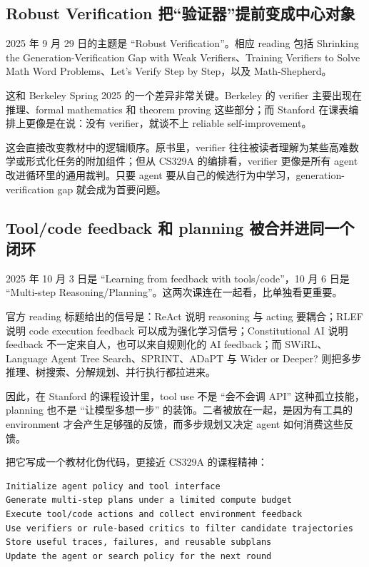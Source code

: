 \subsection{Robust Verification 把“验证器”提前变成中心对象}

2025 年 9 月 29 日的主题是 ``Robust Verification''。相应 reading 包括 Shrinking the Generation-Verification Gap with Weak Verifiers、Training Verifiers to Solve Math Word Problems、Let's Verify Step by Step，以及 Math-Shepherd。

这和 Berkeley Spring 2025 的一个差异非常关键。Berkeley 的 verifier 主要出现在推理、formal mathematics 和 theorem proving 这些部分；而 Stanford 在课表编排上更像是在说：没有 verifier，就谈不上 reliable self-improvement。

这会直接改变教材中的逻辑顺序。原书里，verifier 往往被读者理解为某些高难数学或形式化任务的附加组件；但从 CS329A 的编排看，verifier 更像是所有 agent 改进循环里的通用裁判。只要 agent 要从自己的候选行为中学习，generation-verification gap 就会成为首要问题。

\subsection{Tool/code feedback 和 planning 被合并进同一个闭环}

2025 年 10 月 3 日是 ``Learning from feedback with tools/code''，10 月 6 日是 ``Multi-step Reasoning/Planning''。这两次课连在一起看，比单独看更重要。

官方 reading 标题给出的信号是：ReAct 说明 reasoning 与 acting 要耦合；RLEF 说明 code execution feedback 可以成为强化学习信号；Constitutional AI 说明 feedback 不一定来自人，也可以来自规则化的 AI feedback；而 SWiRL、Language Agent Tree Search、SPRINT、ADaPT 与 Wider or Deeper? 则把多步推理、树搜索、分解规划、并行执行都拉进来。

因此，在 Stanford 的课程设计里，tool use 不是 ``会不会调 API'' 这种孤立技能，planning 也不是 ``让模型多想一步'' 的装饰。二者被放在一起，是因为有工具的 environment 才会产生足够强的反馈，而多步规划又决定 agent 如何消费这些反馈。

把它写成一个教材化伪代码，更接近 CS329A 的课程精神：
\begin{lstlisting}
Initialize agent policy and tool interface
Generate multi-step plans under a limited compute budget
Execute tool/code actions and collect environment feedback
Use verifiers or rule-based critics to filter candidate trajectories
Store useful traces, failures, and reusable subplans
Update the agent or search policy for the next round
\end{lstlisting}


